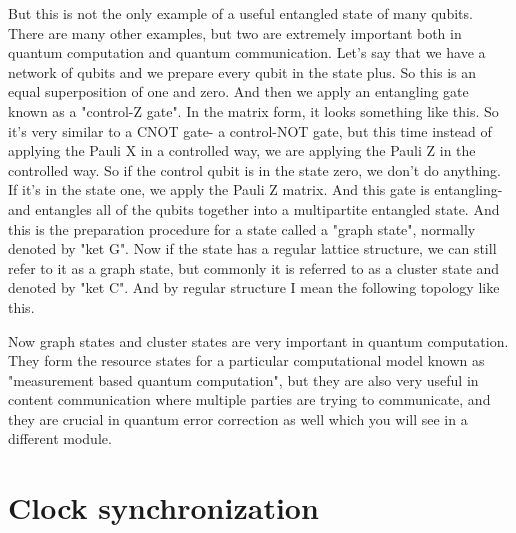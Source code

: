 But this is not the only example of a useful entangled state of many qubits. There are many other examples, but two are extremely important both in quantum computation and quantum communication. Let's say that we have a network of qubits and we prepare every qubit in the state plus. So this is an equal superposition of one and zero. And then we apply an entangling gate known as a "control-Z gate". In the matrix form, it looks something like this. So it's very similar to a CNOT gate- a control-NOT gate, but this time instead of applying the Pauli X in a controlled way, we are applying the Pauli Z in the controlled way. So if the control qubit is in the state zero, we don't do anything. If it's in the state one, we apply the Pauli Z matrix. And this gate is entangling- and entangles all of the qubits together into a multipartite entangled state. And this is the preparation procedure for a state called a "graph state", normally denoted by "ket G". Now if the state has a regular lattice structure, we can still refer to it as a graph state, but commonly it is referred to as a cluster state and denoted by "ket C". And by regular structure I mean the following topology like this.

Now graph states and cluster states are very important in quantum computation. They form the resource states for a particular computational model known as "measurement based quantum computation", but they are also very useful in content communication where multiple parties are trying to communicate, and they are crucial in quantum error correction as well which you will see in a different module.


\section{Clock synchronization}
\label{sec:14-3_clock_sync}

